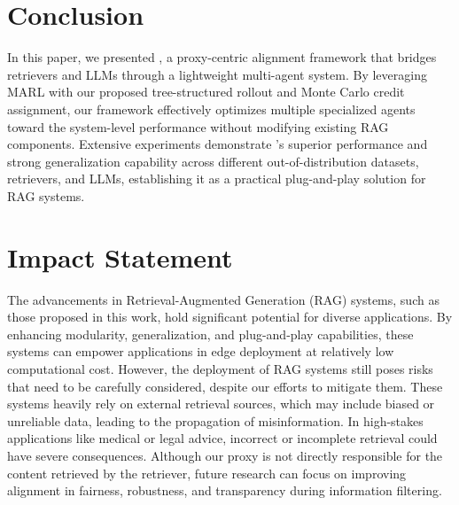 \section{Conclusion}
In this paper, we presented \modelname, a proxy-centric alignment framework that bridges retrievers and LLMs through a lightweight multi-agent system. By leveraging MARL with our proposed tree-structured rollout and Monte Carlo credit assignment, our framework effectively optimizes multiple specialized agents toward the system-level performance without modifying existing RAG components.
Extensive experiments demonstrate \modelname's superior performance and strong generalization capability across different out-of-distribution datasets, retrievers, and LLMs, establishing it as a practical plug-and-play solution for RAG systems.


\section*{Impact Statement}

The advancements in Retrieval-Augmented Generation (RAG) systems, such as those proposed in this work, hold significant potential for diverse applications. 
By enhancing modularity, generalization, and plug-and-play capabilities, these systems can empower applications in edge deployment at relatively low computational cost. 
However, the deployment of RAG systems still poses risks that need to be carefully considered, despite our efforts to mitigate them. 
These systems heavily rely on external retrieval sources, which may include biased or unreliable data, leading to the propagation of misinformation. 
In high-stakes applications like medical or legal advice, incorrect or incomplete retrieval could have severe consequences. 
Although our proxy is not directly responsible for the content retrieved by the retriever, future research can focus on improving alignment in fairness, robustness, and transparency during information filtering.